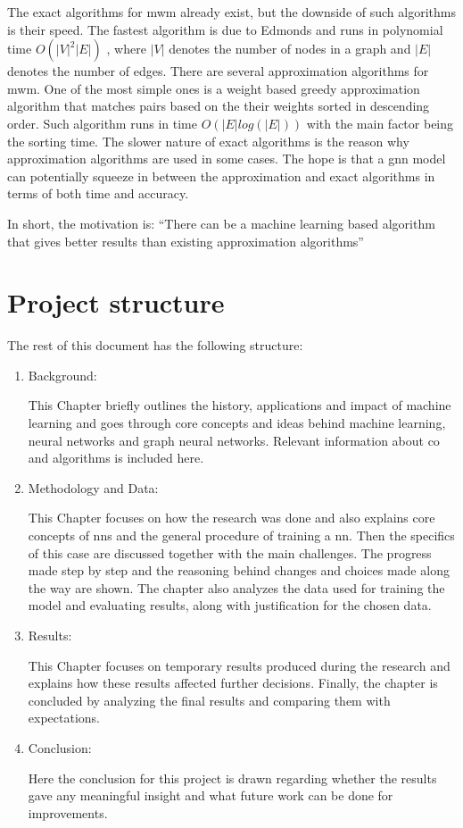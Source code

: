 The exact algorithms for \gls{mwm} already exist, but the downside of such algorithms is their speed. The fastest algorithm is due to Edmonds and runs in polynomial time $O(|V|^{2} |E| )$ \cite{runtimeBlossomWiki}, where $|V|$ denotes the number of nodes in a graph and $|E|$ denotes the number of edges. There are several approximation algorithms for \gls{mwm}. One of the most simple ones is a weight based greedy approximation algorithm that matches pairs based on the their weights sorted in descending order. Such algorithm runs in time $O(|E| log(|E|))$ with the main factor being the sorting time. The slower nature of exact algorithms is the reason why approximation algorithms are used in some cases. The hope is that a \gls{gnn} model can potentially squeeze in between the approximation and exact algorithms in terms of both time and accuracy.

In short, the motivation is: “There can be a machine learning based algorithm that gives better results than existing approximation algorithms”

\section{Project structure}

The rest of this document has the following structure:

\begin{enumerate}

\item Background:

This Chapter briefly outlines the history, applications and impact of machine learning and goes through core concepts and ideas behind machine learning, neural networks and graph neural networks. Relevant information about \gls{co} and algorithms is included here.

\item Methodology and Data:

This Chapter focuses on how the research was done and also explains core concepts of \gls{nn}s and the general procedure of training a \gls{nn}. Then the specifics of this case are discussed together with the main challenges. The progress made step by step and the reasoning behind changes and choices made along the way are shown. The chapter also analyzes the data used for training the model and evaluating results, along with justification for the chosen data.

\item Results:

This Chapter focuses on temporary results produced during the research and explains how these results affected further decisions. Finally, the chapter is concluded by analyzing the final results and comparing them with expectations.

\item Conclusion:

Here the conclusion for this project is drawn regarding whether the results gave any meaningful insight and what future work can be done for improvements.

\end{enumerate}

